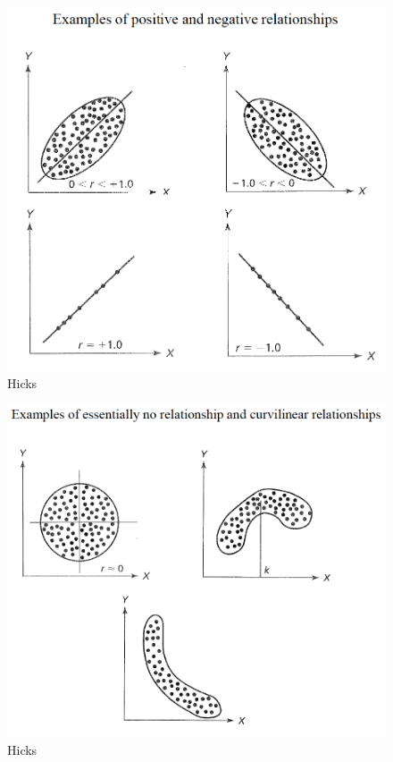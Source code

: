\documentclass[]{book}
\theoremstyle{definition}
\theoremstyle{definition}
\theoremstyle{definition}
\theoremstyle{remark}
\begin{document}
{\begin{figure}
\centering
\includegraphics{img/hickscor2.png}
\caption{Hicks}
\end{figure}

\begin{figure}
\centering
\includegraphics{img/hickscor3.png}
\caption{Hicks}
\end{figure}

}
\end{document}
